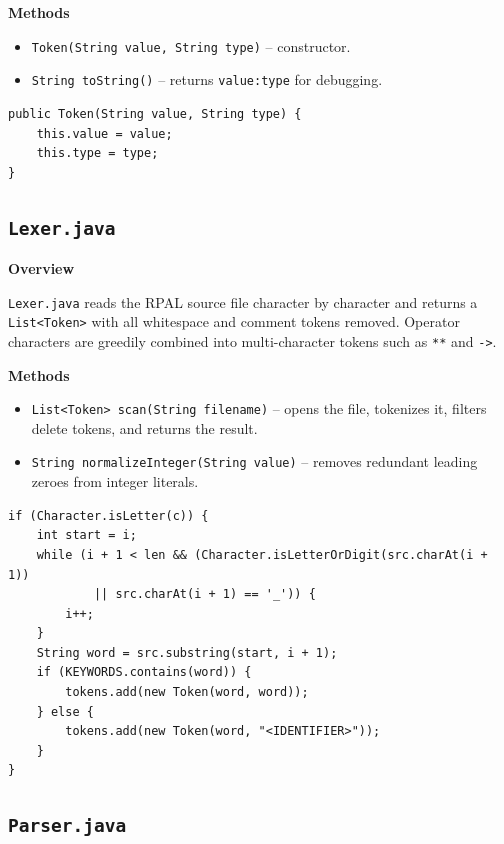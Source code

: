 \documentclass[12pt,a4paper]{article}
\begin{document}
\textbf{Methods}

\begin{itemize}
    \item \texttt{Token(String value, String type)} -- constructor.
    \item \texttt{String toString()} -- returns \texttt{value:type} for debugging.
\end{itemize}

\begin{lstlisting}[style=javacode, caption={Token constructor}]
public Token(String value, String type) {
    this.value = value;
    this.type = type;
}
\end{lstlisting}

\subsection{\texttt{Lexer.java}}

\textbf{Overview}

\texttt{Lexer.java} reads the RPAL source file character by character and returns a \texttt{List<Token>} with all whitespace and comment tokens removed. Operator characters are greedily combined into multi-character tokens such as \texttt{**} and \texttt{->}.

\textbf{Methods}

\begin{itemize}
    \item \texttt{List<Token> scan(String filename)} -- opens the file, tokenizes it, filters delete tokens, and returns the result.
    \item \texttt{String normalizeInteger(String value)} -- removes redundant leading zeroes from integer literals.
\end{itemize}

\begin{lstlisting}[style=javacode, caption={Lexer: identifier recognition}]
if (Character.isLetter(c)) {
    int start = i;
    while (i + 1 < len && (Character.isLetterOrDigit(src.charAt(i + 1))
            || src.charAt(i + 1) == '_')) {
        i++;
    }
    String word = src.substring(start, i + 1);
    if (KEYWORDS.contains(word)) {
        tokens.add(new Token(word, word));
    } else {
        tokens.add(new Token(word, "<IDENTIFIER>"));
    }
}
\end{lstlisting}

\subsection{\texttt{Parser.java}}
\end{document}

